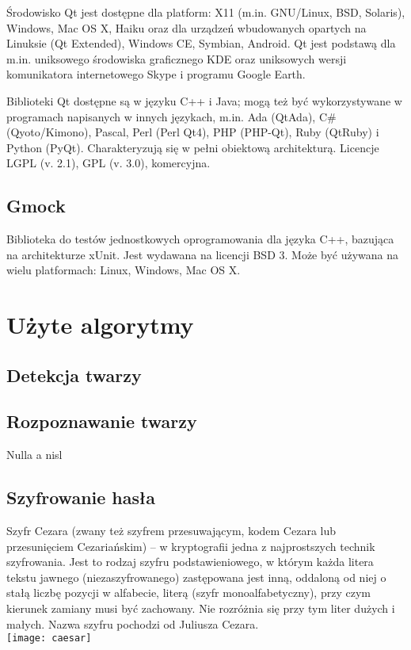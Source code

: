 \documentclass[eng,printmode]{mgr}
\begin{document}
Środowisko Qt jest dostępne dla platform: X11 (m.in. GNU/Linux, BSD, Solaris), Windows, Mac OS X, Haiku oraz dla urządzeń wbudowanych opartych na Linuksie (Qt Extended), Windows CE, Symbian, Android. Qt jest podstawą dla m.in. uniksowego środowiska graficznego KDE oraz uniksowych wersji komunikatora internetowego Skype i programu Google Earth.

Biblioteki Qt dostępne są w języku C++ i Java; mogą też być wykorzystywane w programach napisanych w innych językach, m.in. Ada (QtAda), C\# (Qyoto/Kimono), Pascal, Perl (Perl Qt4), PHP (PHP-Qt), Ruby (QtRuby) i Python (PyQt). Charakteryzują się w pełni obiektową architekturą.
Licencje LGPL (v. 2.1), GPL (v. 3.0), komercyjna.\cite{wikiqt}
\subsection{Gmock}
Biblioteka do testów jednostkowych oprogramowania dla języka C++, bazująca na architekturze xUnit. Jest wydawana na licencji BSD 3. Może być używana na wielu platformach: Linux, Windows, Mac OS X.

\section{Użyte algorytmy}
\subsection{Detekcja twarzy}
\subsection{Rozpoznawanie twarzy}
Nulla a nisl

\subsection{Szyfrowanie hasła}
Szyfr Cezara (zwany też szyfrem przesuwającym, kodem Cezara lub przesunięciem Cezariańskim) – w kryptografii jedna z najprostszych technik szyfrowania. Jest to rodzaj szyfru podstawieniowego, w którym każda litera tekstu jawnego (niezaszyfrowanego) zastępowana jest inną, oddaloną od niej o stałą liczbę pozycji w alfabecie, literą (szyfr monoalfabetyczny), przy czym kierunek zamiany musi być zachowany. Nie rozróżnia się przy tym liter dużych i małych. Nazwa szyfru pochodzi od Juliusza Cezara.\cite{szyfrcezara}\\
\texttt{[image: caesar]}
\end{document}
